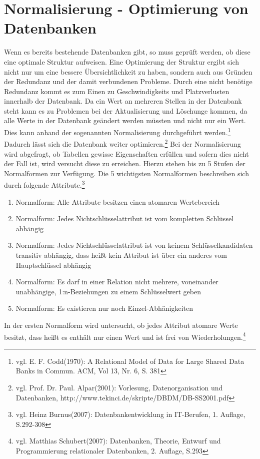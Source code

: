 \section{Normalisierung - Optimierung von Datenbanken}
\label{secNormalisierung}
Wenn es bereits bestehende Datenbanken gibt, so muss geprüft werden, ob diese eine optimale Struktur aufweisen.
Eine Optimierung der Struktur ergibt sich nicht nur um eine bessere Übersichtlichkeit zu haben, sondern auch aus Gründen der Redundanz und der damit verbundenen Probleme.
Durch eine nicht benötige Redundanz kommt es zum Einen zu Geschwindigkeits und Platzverlusten innerhalb der Datenbank.
Da ein Wert an mehreren Stellen in der Datenbank steht kann es zu Problemen bei der Aktualisierung und Löschunge kommen, da alle Werte in der Datenbank geändert werden müssten und nicht nur ein Wert.
Dies kann anhand der sogenannten Normalisierung durchgeführt werden.\footnote{vgl. E. F. Codd(1970): A Relational Model of Data for Large Shared Data Banks in Commun. ACM, Vol 13, Nr. 6, S. 381} Dadurch lässt sich die Datenbank weiter optimieren.\footnote{vgl. Prof. Dr. Paul. Alpar(2001): Vorlesung, Datenorganisation und Datenbanken,  http://www.tekinci.de/skripte/DBDM/DB-SS2001.pdf}
Bei der Normalisierung wird abgefragt, ob Tabellen gewisse Eigenschaften erfüllen und sofern dies nicht der Fall ist, wird versucht diese zu erreichen.
Hierzu stehen bis zu 5 Stufen der Normalformen zur Verfügung.
Die 5 wichtigsten Normalformen beschreiben sich durch folgende Attribute.\footnote{vgl. Heinz Burnus(2007): Datenbankentwicklung in IT-Berufen, 1. Auflage, S.292-308}

\begin{enumerate}
\item Normalform: Alle Attribute besitzen einen atomaren Wertebereich
\item Normalform: Jedes Nichtschlüsselattribut ist vom kompletten Schlüssel abhängig
\item Normalform: Jedes Nichtschlüsselattribut ist von keinem Schlüsselkandidaten transitiv abhängig, dass heißt kein Attribut ist über ein anderes vom Hauptschlüssel abhängig
\item Normalform: Es darf in einer Relation nicht mehrere, voneinander unabhängige, 1:n-Beziehungen zu einem Schlüsselwert geben
\item Normalform: Es existieren nur noch Einzel-Abhänigkeiten
\end{enumerate}


In der ersten Normalform wird untersucht, ob jedes Attribut atomare Werte besitzt, dass heißt es enthält nur einen Wert und ist frei von Wiederholungen.\footnote{vgl. Matthias Schubert(2007): Datenbanken, Theorie, Entwurf und Programmierung relationaler Datenbanken, 2. Auflage, S.293}


